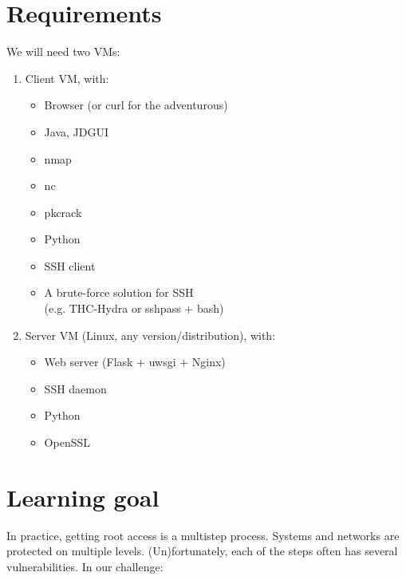 \documentclass[11pt, a4paper]{article}
\begin{document}
\section{Requirements}

We will need two VMs:

\begin{enumerate}
  \item Client VM, with:
  \vspace{-0.5em}
  \begin{multicols}{2}
	\begin{itemize}
		\setlength\itemsep{-0.2em}
		\item Browser (or curl for the adventurous)
  		\item Java, JDGUI
  		\item nmap
  		\item nc
		\item pkcrack
  		\item Python
  		\item SSH client
  		\item A brute-force solution for SSH\\ (e.g. \mbox{THC-Hydra} or sshpass + bash)
	\end{itemize}
\end{multicols}

  \item Server VM (Linux, any version/distribution), with:
    \vspace{-0.5em}
  \begin{multicols}{2}
        \begin{itemize}
		\setlength\itemsep{-0.2em}
          \item Web server (Flask + uwsgi + Nginx)
          \item SSH daemon
          \item Python
          \item OpenSSL
        \end{itemize}
        \end{multicols}
\end{enumerate}



\section{Learning goal}

In practice, getting root access is a multistep process. Systems and
networks are protected on multiple levels. (Un)fortunately, each of the
steps often has several vulnerabilities. In our challenge:
\end{document}
